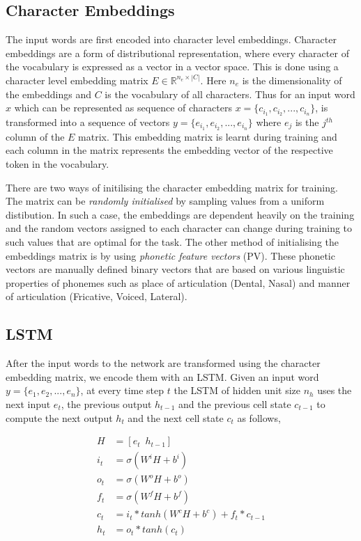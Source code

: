\documentclass[11pt,letterpaper]{article}
\begin{document}
\subsection{Character Embeddings}

The input words are first encoded into character level embeddings. Character embeddings are a form of distributional representation, where every character of the vocabulary is expressed as a vector in a vector space. This is done using a character level embedding matrix $E \in \mathbb{R}^{n_e \times |C|}$. Here $n_e$ is the dimensionality of the embeddings and $C$ is the vocabulary of all characters. Thus for an input word $x$ which can be represented as sequence of characters $x = \{c_{i_1}, c_{i_2}, ..., c_{i_n}\}$, is transformed into a sequence of vectors $y = \{e_{i_1}, e_{i_2}, ..., e_{i_n}\}$ where $e_j$ is the $j^{th}$ column of the $E$ matrix. This embedding matrix is learnt during training and each column in the matrix represents the embedding vector of the respective token in the vocabulary. 

There are two ways of initilising the character embedding matrix for training. The matrix can be \textit{randomly initialised} by sampling values from a uniform distibution. In such a case, the embeddings are dependent heavily on the training and the random vectors assigned to each character can change during training to such values that are optimal for the task. The other method of initialising the embeddings matrix is by using \textit{phonetic feature vectors} (PV). These phonetic vectors are manually defined binary vectors that are based on various linguistic properties of phonemes such as place of articulation (Dental, Nasal) and manner of articulation (Fricative, Voiced, Lateral).

\subsection{LSTM}

After the input words to the network are transformed using the character embedding matrix, we encode them with an LSTM. Given an input word $y = \{e_1, e_2, ..., e_n\}$, at every time step $t$ the LSTM of hidden unit size $n_h$ uses the next input $e_t$, the previous output $h_{t-1}$ and the previous cell state $c_{t-1}$ to compute the next output $h_t$ and the next cell state $c_t$ as follows,

\begin{align}
H &= [e_t \enspace h_{t-1}] \\
i_t &= \sigma (W^iH + b^i) \\
o_t &= \sigma (W^oH + b^o) \\
f_t &= \sigma (W^fH + b^f) \\
c_t &= i_t * tanh(W^cH + b^c) + f_t * c_{t-1} \\
h_t &= o_t * tanh(c_t)
\end{align}
\end{document}
